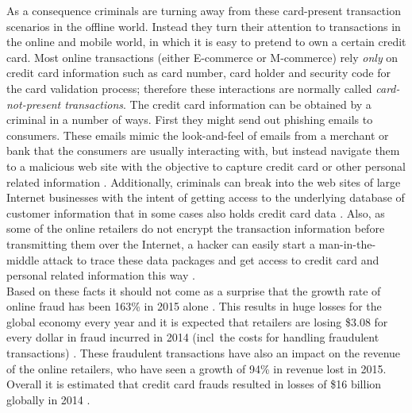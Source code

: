 As a consequence criminals are turning away from these card-present transaction scenarios in the offline world. Instead they turn their attention to transactions in the online and mobile world, in which it is easy to pretend to own a certain credit card. Most online transactions (either \gls{E-commerce} or \gls{M-commerce}) rely \emph{only} on credit card information such as card number, card holder and security code for the card validation process; therefore these interactions are normally called \emph{card-not-present transactions}. The credit card information can be obtained by a criminal in a number of ways. First they might send out phishing emails to consumers. These emails mimic the look-and-feel of emails from a merchant or bank that the consumers are usually interacting with, but instead navigate them to a malicious web site with the objective to capture credit card or other personal related information \citep{ConsumerAction2009}. Additionally, criminals can break into the web sites of large Internet businesses with the intent of getting access to the underlying database of customer information that in some cases also holds credit card data \citep{Holmes2015}. Also, as some of the online retailers do not encrypt the transaction information before transmitting them over the Internet, a hacker can easily start a man-in-the-middle attack to trace these data packages and get access to credit card and personal related information this way \citep{Captain2015}. \\

Based on these facts it should not come as a surprise that the growth rate of online fraud has been 163\% in 2015 alone \citep{PYMNTS2016}. This results in huge losses for the global economy every year and it is expected that retailers are losing \$3.08 for every dollar in fraud incurred in 2014 (\gls{incl}\ the costs for handling fraudulent transactions) \citep{Rampton2015}. These fraudulent transactions have also an impact on the revenue of the online retailers, who have seen a growth of 94\% in revenue lost in 2015. Overall it is estimated that credit card frauds resulted in losses of \$16 billion globally in 2014 \citep{PYMNTS2016} \citep{BusinessWire2015}. \\

